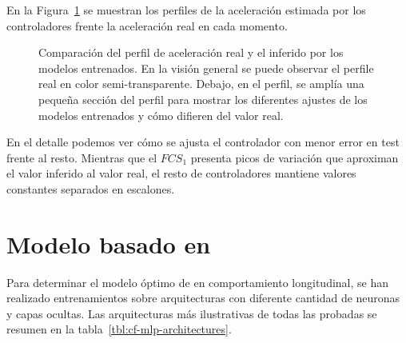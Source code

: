 En la Figura~\ref{fig:fcs-test-comparisons} se muestran los perfiles de la aceleración estimada por los controladores frente la aceleración real en cada momento. 

\begin{figure}
	\centering
	\qquad
	\caption[Comparación del perfil de aceleración real y el inferido por los modelos entrenados]{Comparación del perfil de aceleración real y el inferido por los modelos entrenados. En la visión general se puede observar el perfile real en color semi-transparente. Debajo, en el perfil, se amplía una pequeña sección del perfil para mostrar los diferentes ajustes de los modelos entrenados y cómo difieren del valor real.}
	\label{fig:fcs-test-comparisons}
\end{figure}

En el detalle podemos ver cómo se ajusta el controlador con menor error en test frente al resto. Mientras que el $FCS_1$ presenta picos de variación que aproximan el valor inferido al valor real, el resto de controladores mantiene valores constantes separados en escalones.

\section{Modelo basado en }

Para determinar el modelo óptimo de  en comportamiento longitudinal, se han realizado entrenamientos sobre arquitecturas con diferente cantidad de neuronas y capas ocultas. Las arquitecturas más ilustrativas de todas las probadas se resumen en la tabla~\ref{tbl:cf-mlp-architectures}.

